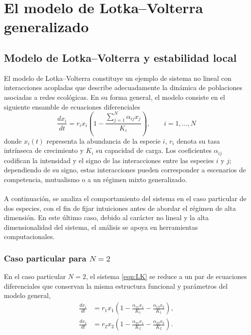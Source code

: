 \chapter{El modelo de Lotka--Volterra generalizado}

\section{Modelo de Lotka--Volterra y estabilidad local}

\setlength{\parindent}{0cm} El modelo de Lotka--Volterra constituye un ejemplo de sistema no lineal con interacciones acopladas que describe adecuadamente la dinámica de poblaciones asociadas a redes ecológicas. En su forma general, el modelo consiste en el siguiente ensamble de ecuaciones diferenciales
\begin{equation}\label{eqn:LK}
	\frac{dx_i}{dt}=r_ix_i\left(1-\frac{\sum_{j=1}^N \alpha_{ij}x_j}{K_i}\right),\qquad i=1,\dots,N
\end{equation}
donde $x_i(t)$ representa la abundancia de la especie $i$, $r_i$ denota su tasa intrínseca de crecimiento y $K_i$ su capacidad de carga. Los coeficientes $\alpha_{ij}$ codifican la intensidad y el signo de las interacciones entre las especies $i$ y $j$; dependiendo de su signo, estas interacciones pueden corresponder a escenarios de competencia, mutualismo o a un régimen mixto generalizado.\\
\\
A continuación, se analiza el comportamiento del sistema en el caso particular de dos especies, con el fin de fijar intuiciones antes de abordar el régimen de alta dimensión. En este último caso, debido al carácter no lineal y la alta dimensionalidad del sistema, el análisis se apoya en herramientas computacionales.

\subsection{Caso particular para $N=2$}

En el caso particular $N=2$, el sistema \eqref{eqn:LK} se reduce a un par de ecuaciones diferenciales que conservan la misma estructura funcional y parámetros del modelo general,
\begin{align*}
	\frac{dx_1}{dt}&=r_1 x_1\left(1-\frac{\alpha_{11}x_1}{K_1}-\frac{\alpha_{12}x_2}{K_1}\right),\\
	\frac{dx_2}{dt}&=r_2 x_2\left(1-\frac{\alpha_{21}x_1}{K_2}-\frac{\alpha_{22}x_2}{K_2}\right).
\end{align*}

